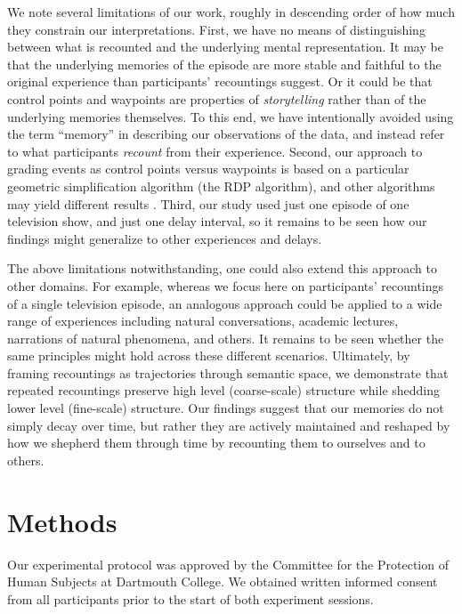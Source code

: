 \documentclass[10pt]{article}
\begin{document}
We note several limitations of our work, roughly in descending order of how much they constrain our interpretations.
First, we have no means of distinguishing between what is recounted and the underlying mental representation.
It may be that the underlying memories of the episode are more stable and faithful to the original experience than participants' recountings suggest.
Or it could be that control points and waypoints are properties of \textit{storytelling} rather than of the underlying memories themselves.
To this end, we have intentionally avoided using the term ``memory'' in describing our observations of the data, and instead refer to what participants \textit{recount} from their experience.
Second, our approach to grading events as control points versus waypoints is based on a particular geometric simplification algorithm (the RDP algorithm), and other algorithms may yield different results \citep[though comparisons suggest that the RDP algorithm tends to produce the most faithful simplifications;][]{ShiCheu13}.
Third, our study used just one episode of one television show, and just one delay interval, so it remains to be seen how our findings might generalize to other experiences and delays.

The above limitations notwithstanding, one could also extend this approach to other domains.
For example, whereas we focus here on participants' recountings of a single television episode, an analogous approach could be applied to a wide range of experiences including natural conversations, academic lectures, narrations of natural phenomena, and others.
It remains to be seen whether the same principles might hold across these different scenarios.
Ultimately, by framing recountings as trajectories through semantic space, we demonstrate that repeated recountings preserve high level (coarse-scale) structure while shedding lower level (fine-scale) structure.
Our findings suggest that our memories do not simply decay over time, but rather they are actively maintained and reshaped by how we shepherd them through time by recounting them to ourselves and to others.

\section*{Methods}

Our experimental protocol was approved by the Committee for the Protection of Human Subjects at Dartmouth College.
We obtained written informed consent from all participants prior to the start of both experiment sessions.
\end{document}
